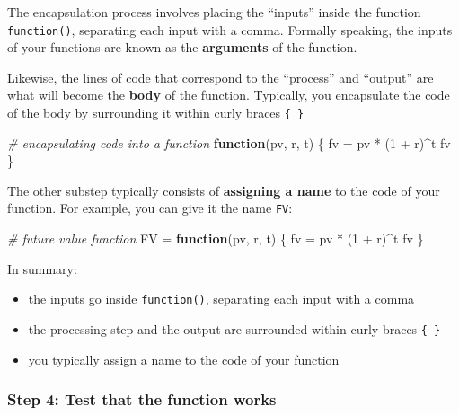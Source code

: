 \documentclass[
]{book}
\newenvironment{Shaded}{\begin{snugshade}}{\end{snugshade}}
\newcommand{\CommentTok}[1]{\textcolor[rgb]{0.56,0.35,0.01}{\textit{#1}}}
\newcommand{\ControlFlowTok}[1]{\textcolor[rgb]{0.13,0.29,0.53}{\textbf{#1}}}
\newcommand{\DecValTok}[1]{\textcolor[rgb]{0.00,0.00,0.81}{#1}}
\newcommand{\NormalTok}[1]{#1}
\newcommand{\OtherTok}[1]{\textcolor[rgb]{0.56,0.35,0.01}{#1}}
\newcommand{\SpecialCharTok}[1]{\textcolor[rgb]{0.00,0.00,0.00}{#1}}
\begin{document}
The encapsulation process involves placing the ``inputs'' inside the function
\texttt{function()}, separating each input with a comma. Formally speaking, the
inputs of your functions are known as the \textbf{arguments} of the function.

Likewise, the lines of code that correspond to the ``process'' and ``output'' are
what will become the \textbf{body} of the function. Typically, you encapsulate the
code of the body by surrounding it within curly braces \texttt{\{\ \}}

\begin{Shaded}
\begin{Highlighting}[]
\CommentTok{\# encapsulating code into a function}
\ControlFlowTok{function}\NormalTok{(pv, r, t) \{}
\NormalTok{  fv }\OtherTok{=}\NormalTok{ pv }\SpecialCharTok{*}\NormalTok{ (}\DecValTok{1} \SpecialCharTok{+}\NormalTok{ r)}\SpecialCharTok{\^{}}\NormalTok{t}
\NormalTok{  fv}
\NormalTok{\}}
\end{Highlighting}
\end{Shaded}

The other substep typically consists of \textbf{assigning a name} to the code of
your function. For example, you can give it the name \texttt{FV}:

\begin{Shaded}
\begin{Highlighting}[]
\CommentTok{\# future value function}
\NormalTok{FV }\OtherTok{=} \ControlFlowTok{function}\NormalTok{(pv, r, t) \{}
\NormalTok{  fv }\OtherTok{=}\NormalTok{ pv }\SpecialCharTok{*}\NormalTok{ (}\DecValTok{1} \SpecialCharTok{+}\NormalTok{ r)}\SpecialCharTok{\^{}}\NormalTok{t}
\NormalTok{  fv}
\NormalTok{\}}
\end{Highlighting}
\end{Shaded}

In summary:

\begin{itemize}
\item
  the inputs go inside \texttt{function()}, separating each input with a comma
\item
  the processing step and the output are surrounded within curly braces \texttt{\{\ \}}
\item
  you typically assign a name to the code of your function
\end{itemize}

\hypertarget{step-4-test-that-the-function-works}{%
\subsubsection*{Step 4: Test that the function works}\label{step-4-test-that-the-function-works}}
\end{document}
